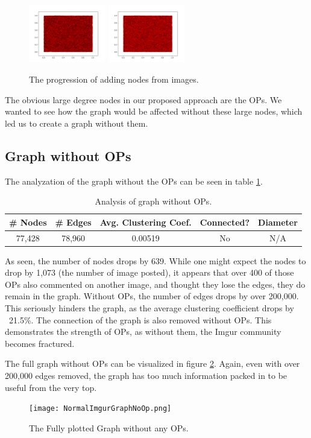 \documentclass{article}
\begin{document}
\begin{figure}[h!]
    \includegraphics[width=0.3\textwidth]{NormalImgurGraph40.png}
    \includegraphics[width=0.3\textwidth]{NormalImgurGraph45.png}
    \caption{The progression of adding nodes from images.}
    \label{545post}
\end{figure}

\par The obvious large degree nodes in our proposed approach are the OPs. We wanted to see how the graph would be affected without these large nodes, which led us to create a graph without them.

\subsection{Graph without OPs}
\par The analyzation of the graph without the OPs can be seen in table \ref{table:2}. 
\begin{table}
\centering
 \begin{tabular}{||c c c c c||} 
 \hline
 \# Nodes & \# Edges & Avg. Clustering Coef. & Connected? & Diameter \\ [0.5ex] 
 \hline\hline
 77,428 & 78,960 & 0.00519 & No & N/A \\ 
 \hline
\end{tabular} 
\caption{Analysis of graph without OPs.}
\label{table:2}
\end{table}

As seen, the number of nodes drops by 639. While one might expect the nodes to drop by 1,073 (the number of image posted), it appears that over 400 of those OPs also commented on another image, and thought they lose the edges, they do remain in the graph. Without OPs, the number of edges drops by over 200,000. This seriously hinders the graph, as the average clustering coefficient drops by ~21.5\%. The connection of the graph is also removed without OPs. This demonstrates the strength of OPs, as without them, the Imgur community becomes fractured.  
\par The full graph without OPs can be visualized in figure \ref{vofnoOPs}. Again, even with over 200,000 edges removed, the graph has too much information packed in to be useful from the very top. 
\begin{figure}[h!]
    \centering
    \texttt{[image: NormalImgurGraphNoOp.png]}
    \caption{The Fully plotted Graph without any OPs.}
    \label{vofnoOPs}
\end{figure}
\end{document}

